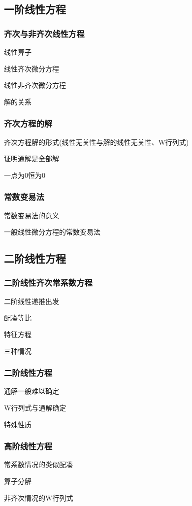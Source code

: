 \documentclass[a4paper,UTF8,fontset=windows,AutoFakeBold]{ctexart}
\theoremstyle{ex}
\begin{document}
\subsection{一阶线性方程}
\subsubsection{齐次与非齐次线性方程}
线性算子

线性齐次微分方程

线性非齐次微分方程

解的关系

\subsubsection{齐次方程的解}
齐次方程解的形式(线性无关性与解的线性无关性、W行列式)

证明通解是全部解

一点为0恒为0

\subsubsection{常数变易法}
常数变易法的意义

一般线性微分方程的常数变易法

\subsection{二阶线性方程}
\subsubsection{二阶线性齐次常系数方程}
二阶线性递推出发

配凑等比

特征方程

三种情况

\subsubsection{二阶线性方程}
通解一般难以确定

W行列式与通解确定

特殊性质

\subsubsection{高阶线性方程}
常系数情况的类似配凑

算子分解

非齐次情况的W行列式
\end{document}

